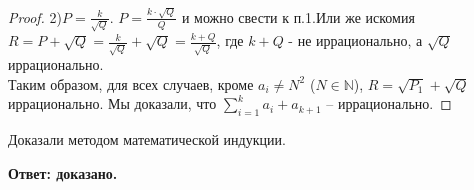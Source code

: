 \documentclass[a4paper,12pt]{article} %
\begin{document}
\begin{proof}
2)$P = \frac{k}{\sqrt{Q}}$. $P = \frac{k\cdot \sqrt{Q}}{Q}$ и можно свести к п.1.Или же искомия $R = P + \sqrt{Q} = \frac{k}{\sqrt{Q}}+ \sqrt{Q} = \frac{k + Q}{\sqrt{Q}}$, где $k+Q$ - не иррационально, а $\sqrt{Q}$ иррационально.\\
Таким образом, для всех случаев, кроме $a_i \neq N^2$ ($N \in \mathbb{N}$), $R = \sqrt{{P_1}} + \sqrt{Q}$ иррационально.
Мы доказали,  что  $\sum\limits_{i=1}^k a_{i} + a_{k+1}$ -- иррационально.
\end{proof}
Доказали методом математической индукции.
\begin{flushright}
\begin{large}
\textbf {Ответ: доказано. }
\end{large}
\end{flushright}
\end{document}
